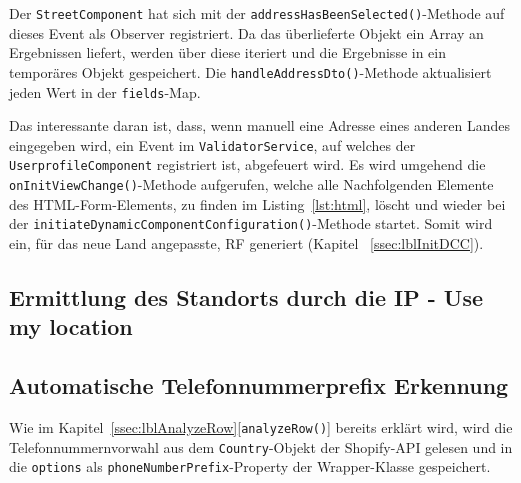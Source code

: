 Der \texttt{StreetComponent} hat sich mit der \texttt{addressHasBeenSelected()}-Methode auf dieses Event als Observer registriert. Da das überlieferte Objekt ein Array an Ergebnissen liefert, werden über diese iteriert und die Ergebnisse in ein temporäres Objekt gespeichert. Die \texttt{handleAddressDto()}-Methode aktualisiert jeden Wert in der \texttt{fields}-Map. 

Das interessante daran ist, dass, wenn manuell eine Adresse eines anderen Landes eingegeben wird, ein Event im \texttt{ValidatorService}, auf welches der \texttt{UserprofileComponent} registriert ist, abgefeuert wird. Es wird umgehend die \texttt{onInitViewChange()}-Methode aufgerufen, welche alle Nachfolgenden Elemente des HTML-Form-Elements, zu finden im Listing~\ref{lst:html}, löscht und wieder bei der \texttt{initiateDynamicComponentConfiguration()}-Methode startet. Somit wird ein, für das neue Land angepasste, RF generiert (Kapitel ~\ref{ssec:lblInitDCC}).


\subsection{Ermittlung des Standorts durch die IP - Use my location}

\subsection{Automatische Telefonnummerprefix Erkennung}

Wie im Kapitel~\ref{ssec:lblAnalyzeRow}[\texttt{analyzeRow()}] bereits erklärt wird, wird die Telefonnummernvorwahl aus dem \texttt{Country}-Objekt der Shopify-API gelesen und in die \texttt{options} als \texttt{phoneNumberPrefix}-Property der Wrapper-Klasse gespeichert.